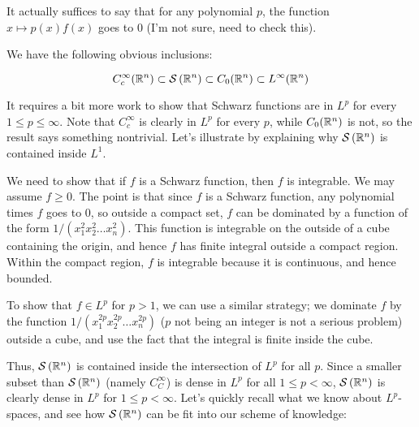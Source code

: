 \documentclass[a4paper]{amsart}
\newcommand{\schwarz}[1]{\mathcal{S}\left(#1\right)}
\begin{document}
It actually suffices to say that for any polynomial $p$, the function
$x \mapsto p(x)f(x)$ goes to $0$ (I'm not sure, need to check this).

We have the following obvious inclusions:

$$C_c^\infty(\R^n) \subset \schwarz{\R^n} \subset C_0(\R^n) \subset L^\infty(\R^n)$$

It requires a bit more work to show that Schwarz functions are in
$L^p$ for every $1 \le p \le \infty$. Note that $C_c^\infty$ is
clearly in $L^p$ for every $p$, while $C_0(\mathbb{R}^n)$ is not, so the
result says something nontrivial. Let's illustrate by explaining why
$\schwarz{\R^n}$ is contained inside $L^1$.

We need to show that if $f$ is a Schwarz function, then $f$ is
integrable.  We may assume $f \ge 0$. The point is that since $f$ is a
Schwarz function, any polynomial times $f$ goes to $0$, so outside a
compact set, $f$ can be dominated by a function of the form
$1/(x_1^2x_2^2 \ldots x_n^2)$. This function is integrable on the
outside of a cube containing the origin, and hence $f$ has finite integral
outside a compact region. Within the compact region, $f$ is integrable
because it is continuous, and hence bounded.

To show that $f \in L^p$ for $p > 1$, we can use a similar strategy;
we dominate $f$ by the function $1/(x_1^{2p}x_2^{2p}\ldots x_n^{2p})$
($p$ not being an integer is not a serious problem) outside a cube,
and use the fact that the integral is finite inside the cube.

Thus, $\schwarz{\R^n}$ is contained inside the intersection of $L^p$ for all
$p$. Since a smaller subset than $\schwarz{\R^n}$ (namely $C_C^\infty$) is dense
in $L^p$ for all $1 \le p < \infty$, $\schwarz{\R^n}$ is clearly dense in $L^p$
for $1 \le p < \infty$. Let's quickly recall what we know about
$L^p$-spaces, and see how $\schwarz{\R^n}$ can be fit into our scheme of knowledge:
\end{document}
